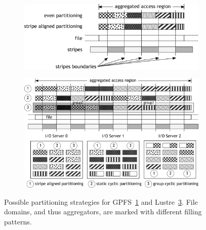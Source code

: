 \begin{figure}[!htb]
  \centering
  \begin{subfigure}[t]{0.8\textwidth}
  \includegraphics[width=\textwidth]{figures/gpfs-partition}
  \caption{}
  \label{figure: gpfs-partition}
  \end{subfigure}
  \begin{subfigure}[t]{0.9\textwidth}
  \includegraphics[width=\textwidth]{figures/lustre-partition}
  \caption{}
  \label{figure: lustre-partition}
  \end{subfigure}
  \caption{Possible partitioning strategies for GPFS~\ref{figure: gpfs-partition} and Lustre~\ref{figure: lustre-partition}. File domains, and thus aggregators, are marked with different
  filling patterns.}
\end{figure}

